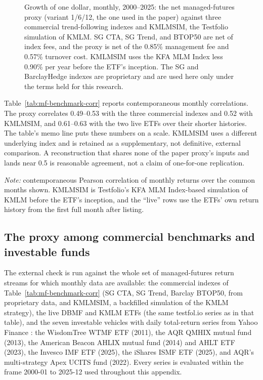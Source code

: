 \documentclass[11pt]{article}
\begin{document}
\begin{figure}[H]
\centering

\caption{Growth of one dollar, monthly, 2000--2025: the net managed-futures
proxy (variant 1/6/12, the one used in the paper) against three commercial
trend-following indexes and KMLMSIM, the Testfolio simulation of KMLM. SG CTA,
SG Trend, and BTOP50 are net of index fees, and the proxy is net of the 0.85\%
management fee and 0.57\% turnover cost. KMLMSIM uses the KFA MLM Index less
0.90\% per year before the ETF's inception. The SG and BarclayHedge indexes are
proprietary and are used here only under the terms held for this research.}
\label{fig:mf-vs-benchmarks}
\end{figure}

Table~\ref{tab:mf-benchmark-corr} reports contemporaneous monthly correlations.
The proxy correlates 0.49--0.53 with the three commercial indexes and 0.52 with
KMLMSIM, and 0.61--0.63 with the two live ETFs over their shorter histories.
The table's memo line puts these numbers on a scale. KMLMSIM uses a different
underlying index and is retained as a supplementary, not definitive, external
comparison. A reconstruction that shares none of the paper proxy's inputs and
lands near 0.5 is reasonable agreement, not a claim of one-for-one replication.

\begin{table}[H]
\centering
\caption{Monthly correlation of the net proxy with trend-following benchmarks}
\label{tab:mf-benchmark-corr}
\small

\begin{minipage}{0.86\textwidth}\footnotesize
\textit{Note:} contemporaneous Pearson correlation of monthly returns over the
common months shown. KMLMSIM is Testfolio's KFA MLM Index-based simulation of
KMLM before the ETF's inception, and the ``live'' rows use the ETFs' own return
history from the first full month after listing.
\end{minipage}
\end{table}

\subsection{The proxy among commercial benchmarks and investable funds}
\label{app:mf-funds}

The external check is run against the whole set of managed-futures return
streams for which monthly data are available: the commercial indexes of
Table~\ref{tab:mf-benchmark-corr} (SG CTA, SG Trend, Barclay BTOP50, from
proprietary data, and KMLMSIM, a backfilled simulation of the KMLM strategy),
the live DBMF and KMLM ETFs (the same testfol.io series as in that table), and
the seven investable vehicles with daily total-return series from Yahoo
Finance \citep{YahooFinance}: the WisdomTree WTMF ETF (2011), the AQR QMHIX
mutual fund (2013), the American Beacon AHLIX mutual fund (2014) and AHLT ETF
(2023), the Invesco IMF ETF (2025), the iShares ISMF ETF (2025), and AQR's
multi-strategy Apex UCITS fund (2022). Every series is evaluated within the
frame 2000-01 to 2025-12 used throughout this appendix.
\end{document}
